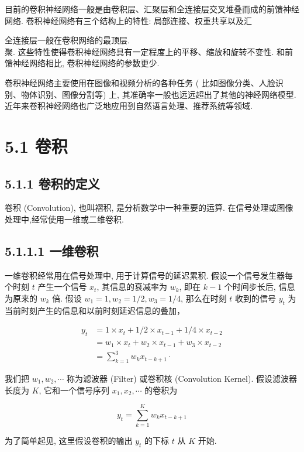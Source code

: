 \documentclass[10pt]{article}
\begin{document}
目前的卷积神经网络一般是由卷积层、汇聚层和全连接层交叉堆叠而成的前馈神经网络. 卷积神经网络有三个结构上的特性: 局部连接、权重共享以及汇

全连接层一般在卷积网络的最顶层.\\
聚. 这些特性使得卷积神经网络具有一定程度上的平移、缩放和旋转不变性. 和前馈神经网络相比, 卷积神经网络的参数更少.

卷积神经网络主要使用在图像和视频分析的各种任务 ( 比如图像分类、人脸识别、物体识别、图像分割等) 上, 其准确率一般也远远超出了其他的神经网络模型. 近年来卷积神经网络也广泛地应用到自然语言处理、推荐系统等领域.

\section*{5.1 卷积}
\subsection*{5.1.1 卷积的定义}
卷积 (Convolution), 也叫褶积, 是分析数学中一种重要的运算. 在信号处理或图像处理中,经常使用一维或二维卷积.

\subsection*{5.1.1.1 一维卷积}
一维卷积经常用在信号处理中, 用于计算信号的延迟累积. 假设一个信号发生器每个时刻 $t$ 产生一个信号 $x_{t}$, 其信息的衰减率为 $w_{k}$, 即在 $k-1$ 个时间步长后, 信息为原来的 $w_{k}$ 倍. 假设 $w_{1}=1, w_{2}=1 / 2, w_{3}=1 / 4$, 那么在时刻 $t$ 收到的信号 $y_{t}$ 为当前时刻产生的信息和以前时刻延迟信息的叠加，


\begin{align*}
y_{t} & =1 \times x_{t}+1 / 2 \times x_{t-1}+1 / 4 \times x_{t-2}  \tag{5.1}\\
& =w_{1} \times x_{t}+w_{2} \times x_{t-1}+w_{3} \times x_{t-2}  \tag{5.2}\\
& =\sum_{k=1}^{3} w_{k} x_{t-k+1} \cdot \tag{5.3}
\end{align*}


我们把 $w_{1}, w_{2}, \cdots$ 称为滤波器 (Filter) 或卷积核 (Convolution Kernel). 假设滤波器长度为 $K$, 它和一个信号序列 $x_{1}, x_{2}, \cdots$ 的卷积为


\begin{equation*}
y_{t}=\sum_{k=1}^{K} w_{k} x_{t-k+1} \tag{5.4}
\end{equation*}


为了简单起见, 这里假设卷积的输出 $y_{t}$ 的下标 $t$ 从 $K$ 开始.
\end{document}
